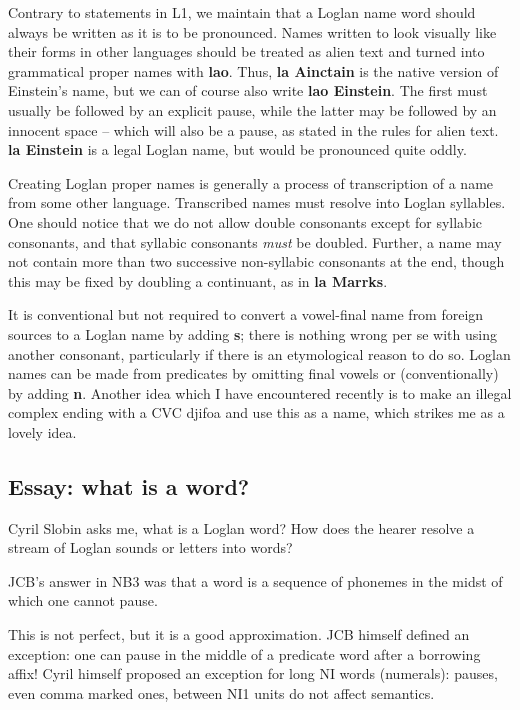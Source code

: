 \documentclass[12pt]{book}
\begin{document}
{Contrary to statements in L1, we maintain that a Loglan name word should always be written as it is to be pronounced.   Names written to look visually like their forms in other languages
should be treated as alien text and turned into grammatical proper names with {\bf lao}.   Thus, {\bf la Ainctain} is the native version of Einstein's name, but we can of course also write
{\bf lao Einstein}.   The first must usually be followed by an explicit pause, while the latter may be followed by an innocent space -- which will also be a pause, as stated in the rules for alien text.
{\bf la Einstein} is a legal Loglan name, but would be pronounced quite oddly.

Creating Loglan proper names is generally a process of transcription of a name from some other language.  Transcribed names must resolve into Loglan syllables.  One should notice that we do not allow double consonants except for syllabic consonants, and that syllabic consonants {\em must\/} be doubled.  Further, a name may not contain more than two successive non-syllabic consonants at the end, though this may be fixed by doubling a continuant, as in {\bf la Marrks}.

It is conventional but not required to convert a vowel-final name from foreign sources to a Loglan name by adding {\bf s};  there is nothing wrong per se with using another consonant, particularly if there is an etymological reason to do so.   Loglan names can be made from predicates by omitting final vowels or (conventionally) by adding {\bf n}.  Another idea which I have encountered recently is to make an illegal complex ending with a CVC djifoa and use this as a name, which strikes me as a lovely idea.

\subsection{Essay:  what is a word?}

Cyril Slobin asks me, what is a Loglan word?  How does the hearer resolve a stream of Loglan sounds or letters into words?

JCB's answer in NB3 was that a word is a sequence of phonemes in the midst of which one cannot pause.

This is not perfect, but it is a good approximation.   JCB himself defined an exception:  one can pause in the middle of a predicate word after a borrowing affix!  Cyril himself proposed an exception for long NI words (numerals):  pauses, even comma marked ones, between NI1 units do not affect semantics.

}
\end{document}
